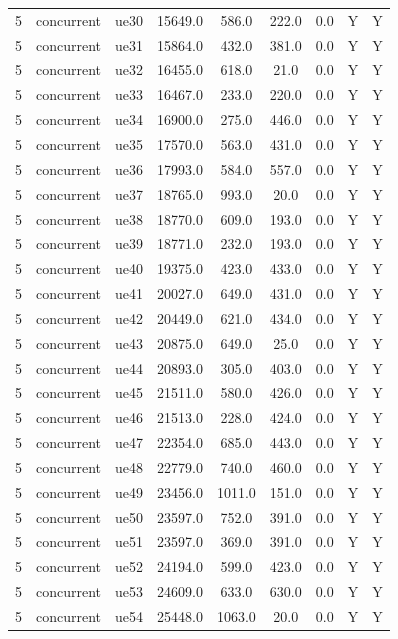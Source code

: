 \begin{table}[ht]
\begin{tabular}{|c|c|c|c|c|c|c|c|c|}
5 & concurrent & ue30 & 15649.0 & 586.0 & 222.0 & 0.0 & Y & Y \\
5 & concurrent & ue31 & 15864.0 & 432.0 & 381.0 & 0.0 & Y & Y \\
5 & concurrent & ue32 & 16455.0 & 618.0 & 21.0 & 0.0 & Y & Y \\
5 & concurrent & ue33 & 16467.0 & 233.0 & 220.0 & 0.0 & Y & Y \\
5 & concurrent & ue34 & 16900.0 & 275.0 & 446.0 & 0.0 & Y & Y \\
5 & concurrent & ue35 & 17570.0 & 563.0 & 431.0 & 0.0 & Y & Y \\
5 & concurrent & ue36 & 17993.0 & 584.0 & 557.0 & 0.0 & Y & Y \\
5 & concurrent & ue37 & 18765.0 & 993.0 & 20.0 & 0.0 & Y & Y \\
5 & concurrent & ue38 & 18770.0 & 609.0 & 193.0 & 0.0 & Y & Y \\
5 & concurrent & ue39 & 18771.0 & 232.0 & 193.0 & 0.0 & Y & Y \\
5 & concurrent & ue40 & 19375.0 & 423.0 & 433.0 & 0.0 & Y & Y \\
5 & concurrent & ue41 & 20027.0 & 649.0 & 431.0 & 0.0 & Y & Y \\
5 & concurrent & ue42 & 20449.0 & 621.0 & 434.0 & 0.0 & Y & Y \\
5 & concurrent & ue43 & 20875.0 & 649.0 & 25.0 & 0.0 & Y & Y \\
5 & concurrent & ue44 & 20893.0 & 305.0 & 403.0 & 0.0 & Y & Y \\
5 & concurrent & ue45 & 21511.0 & 580.0 & 426.0 & 0.0 & Y & Y \\
5 & concurrent & ue46 & 21513.0 & 228.0 & 424.0 & 0.0 & Y & Y \\
5 & concurrent & ue47 & 22354.0 & 685.0 & 443.0 & 0.0 & Y & Y \\
5 & concurrent & ue48 & 22779.0 & 740.0 & 460.0 & 0.0 & Y & Y \\
5 & concurrent & ue49 & 23456.0 & 1011.0 & 151.0 & 0.0 & Y & Y \\
5 & concurrent & ue50 & 23597.0 & 752.0 & 391.0 & 0.0 & Y & Y \\
5 & concurrent & ue51 & 23597.0 & 369.0 & 391.0 & 0.0 & Y & Y \\
5 & concurrent & ue52 & 24194.0 & 599.0 & 423.0 & 0.0 & Y & Y \\
5 & concurrent & ue53 & 24609.0 & 633.0 & 630.0 & 0.0 & Y & Y \\
5 & concurrent & ue54 & 25448.0 & 1063.0 & 20.0 & 0.0 & Y & Y \\

\end{tabular}
\end{table}
